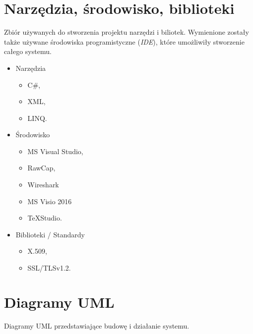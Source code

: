 \documentclass[12pt,a4paper]{article}
\begin{document}
	\section{Narzędzia, środowisko, biblioteki}
	\par Zbiór używanych do stworzenia projektu narzędzi i biliotek. Wymienione zostały także używane środowiska programistyczne (\textit{IDE}), które umożliwiły stworzenie całego systemu. 
	\begin{itemize}
		\item Narzędzia
		\begin{itemize}
			\item C\#,
			\item XML,
			\item LINQ.
		\end{itemize}
	
		\item \'Srodowisko
		\begin{itemize}
			\item MS Visual Studio,
			\item RawCap,
			\item Wireshark
			\item MS Visio 2016 
			\item TeXStudio.
		\end{itemize}
	
		\item Biblioteki / Standardy
		\begin{itemize}
			\item X.509,
			\item SSL/TLSv1.2.
		\end{itemize}
	\end{itemize}
	
	\newpage
	\section{Diagramy UML}
	
	Diagramy UML przedstawiające budowę i działanie systemu.
\end{document}
